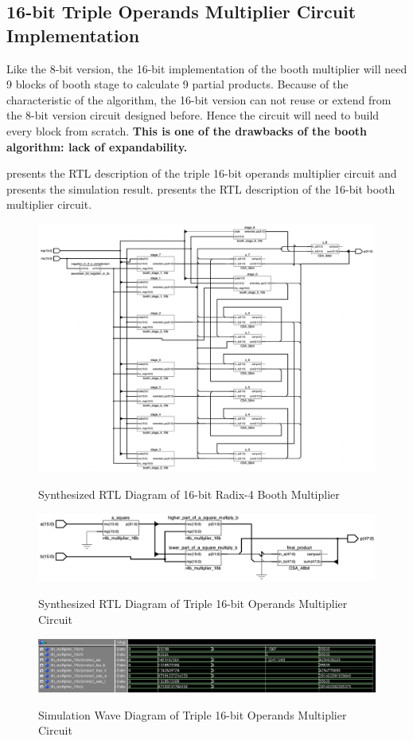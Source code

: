 \newpage
\subsection{16-bit Triple Operands Multiplier Circuit Implementation}

Like the 8-bit version, the 16-bit implementation of the booth multiplier will need 9 blocks of booth stage to calculate 9 partial products.
Because of the characteristic of the algorithm, the 16-bit version can not reuse or extend from the 8-bit version circuit designed before.
Hence the circuit will need to build every block from scratch.
\textbf{This is one of the drawbacks of the booth algorithm: lack of expandability.}

 presents the RTL description of the triple 16-bit operands multiplier circuit
and  presents the simulation result.  presents the RTL description of the 16-bit booth multiplier circuit.

\begin{figure}[!ht]
	\centering
	\caption{Synthesized RTL Diagram of 16-bit Radix-4 Booth Multiplier}
	\includegraphics[width=\textwidth]{../img/overview_booth_16b_rtl.png}
	\label{fig:overview_booth_16b_rtl}
\end{figure}

\begin{figure}[!ht]
	\centering
	\caption{Synthesized RTL Diagram of Triple 16-bit Operands Multiplier Circuit}
	\includegraphics[width=\textwidth]{../img/tri_16b_rtl.png}
	\label{fig:tri_16b_rtl}
\end{figure}

\begin{figure}[!ht]
	\centering
	\caption{Simulation Wave Diagram of Triple 16-bit Operands Multiplier Circuit}
	\includegraphics[width=\textwidth]{../img/tri_16b_sim.png}
	\label{fig:tri_16b_sim}
\end{figure}

\clearpage
